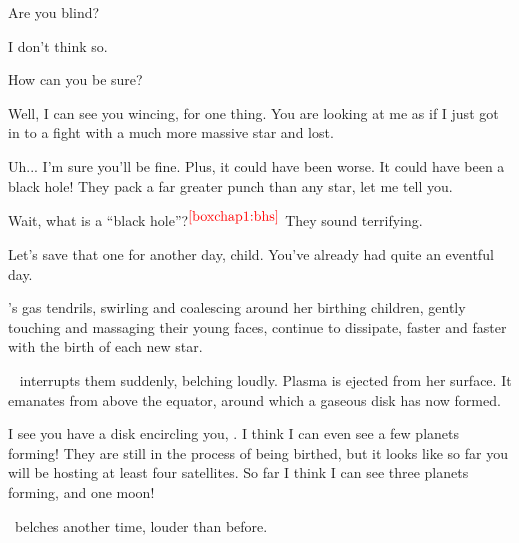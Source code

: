 \documentclass[main.tex]{subfiles}
\begin{document}
\par \Pleione Are you blind?

\par \Maia I don't think so.

\par \Pleione How can you be sure?

\par \Maia Well, I can see you wincing, for one thing.  You are looking at me as if I just got in to a fight with a much more massive star and lost.

\par \Pleione Uh... I'm sure you'll be fine. Plus, it could have been worse.  It could have been a black hole!  They pack a far greater punch than any star, let me tell you.

\par \Maia Wait, what is a ``black hole''?$^{\textcolor{red}{{\ref{boxchap1:bhs}}}}$  They sound terrifying.



\par \Pleione Let's save that one for another day, child.  You've already had quite an eventful day.

\par \nar \rmpleione's gas tendrils, swirling and coalescing around her birthing children, gently touching and massaging their young faces, continue to dissipate, faster and faster with the birth of each new star.

\par \nar \rmelectra~ interrupts them suddenly, belching loudly.  Plasma is ejected from her surface.  It emanates from above the equator, around which a gaseous disk has now formed.  

\par \Maia I see you have a disk encircling you, \rmelectra.  I think I can even see a few planets forming!  They are still in the process of being birthed, but it looks like so far you will be hosting at least four satellites.  So far I think I can see three planets forming, and one moon!

\par \nar \rmelectra~belches another time, louder than before.
\end{document}
